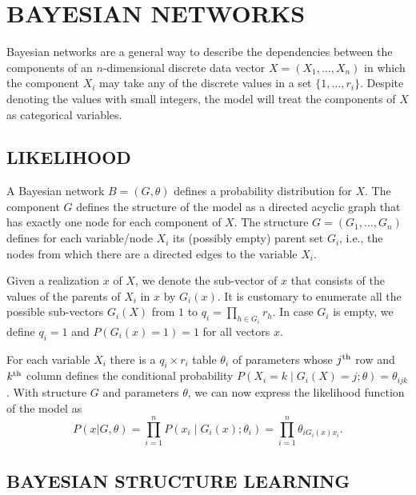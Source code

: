 \section{BAYESIAN NETWORKS}
\label{sec:bns}

Bayesian networks are a general way to describe the dependencies
between the components of an $n$\nobreakdash-dimensional discrete data
vector $X=(X_{1},\ldots,X_{n})$ in which the component $X_{i}$ may
take any of the discrete values in a set $\{1,\ldots,r_{i}\}$.
Despite denoting the values with small integers, the model will treat
the components of $X$ as categorical variables.


\subsection{LIKELIHOOD}
\label{ssec:likelihood}

A Bayesian network $B=(G,\theta)$ defines a probability distribution for
$X$. The component $G$ defines the structure of the model as a
directed acyclic graph that has exactly one node for each component of
$X$. The structure $G=(G_{1},\ldots,G_{n})$ defines for each
variable/node $X_{i}$ its (possibly empty) parent set $G_{i}$, i.e.,
the nodes from which there are a directed edges to the variable
$X_{i}$.

Given a realization $x$ of $X$, we denote the sub\nobreakdash-vector
of $x$ that consists of the values of the parents of $X_{i}$ in $x$ by
$G_{i}(x)$. It is customary to enumerate all the possible
sub\nobreakdash-vectors $G_{i}(X)$ from $1$ to $q_{i}=\prod_{h\in
  G_{i}}r_{h}.$ In case $G_{i}$ is empty, we define $q_{i}=1$ and
$P(G_{i}(x)=1)=1$ for all vectors $x$.

For each variable $X_{i}$ there is a $q_{i}\times r_{i}$ table
$\theta_{i}$ of parameters whose $j^{\textnormal{th}}$ row and
$k^{\textnormal{th}}$ column defines the conditional probability
$P(X_{i}=k\mid G_{i}(X)=j;\theta)=\theta_{ijk}$.  With structure $G$
and parameters $\theta$, we can now express the likelihood function of
the model as
\begin{equation}
P(x|G,\theta)=\prod_{i=1}^{n}P(x_{i}\mid
G_{i}(x);\theta_{i})=\prod_{i=1}^{n}\theta_{iG_{i}(x)x_{i}}.
\end{equation}



\subsection{BAYESIAN STRUCTURE LEARNING}

